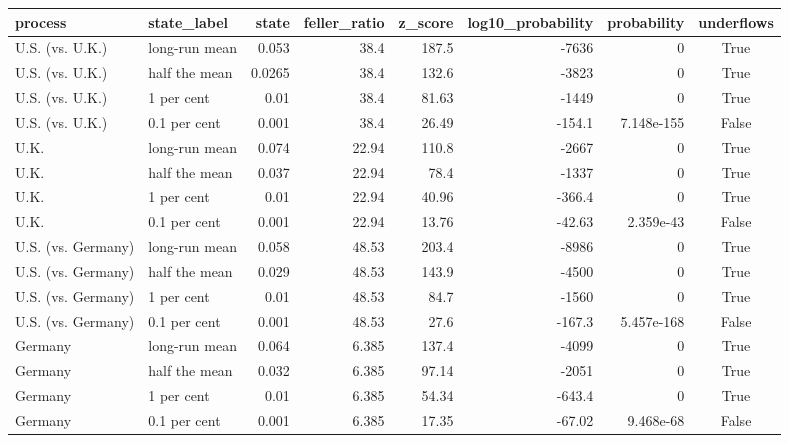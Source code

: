 \begin{tabular}{llrrrrrc}
\toprule
process & state_label & state & feller_ratio & z_score & log10_probability & probability & underflows \\
\midrule
U.S. (vs. U.K.) & long-run mean & 0.053 & 38.4 & 187.5 & -7636 & 0 & True \\
U.S. (vs. U.K.) & half the mean & 0.0265 & 38.4 & 132.6 & -3823 & 0 & True \\
U.S. (vs. U.K.) & 1 per cent & 0.01 & 38.4 & 81.63 & -1449 & 0 & True \\
U.S. (vs. U.K.) & 0.1 per cent & 0.001 & 38.4 & 26.49 & -154.1 & 7.148e-155 & False \\
U.K. & long-run mean & 0.074 & 22.94 & 110.8 & -2667 & 0 & True \\
U.K. & half the mean & 0.037 & 22.94 & 78.4 & -1337 & 0 & True \\
U.K. & 1 per cent & 0.01 & 22.94 & 40.96 & -366.4 & 0 & True \\
U.K. & 0.1 per cent & 0.001 & 22.94 & 13.76 & -42.63 & 2.359e-43 & False \\
U.S. (vs. Germany) & long-run mean & 0.058 & 48.53 & 203.4 & -8986 & 0 & True \\
U.S. (vs. Germany) & half the mean & 0.029 & 48.53 & 143.9 & -4500 & 0 & True \\
U.S. (vs. Germany) & 1 per cent & 0.01 & 48.53 & 84.7 & -1560 & 0 & True \\
U.S. (vs. Germany) & 0.1 per cent & 0.001 & 48.53 & 27.6 & -167.3 & 5.457e-168 & False \\
Germany & long-run mean & 0.064 & 6.385 & 137.4 & -4099 & 0 & True \\
Germany & half the mean & 0.032 & 6.385 & 97.14 & -2051 & 0 & True \\
Germany & 1 per cent & 0.01 & 6.385 & 54.34 & -643.4 & 0 & True \\
Germany & 0.1 per cent & 0.001 & 6.385 & 17.35 & -67.02 & 9.468e-68 & False \\
\bottomrule
\end{tabular}
